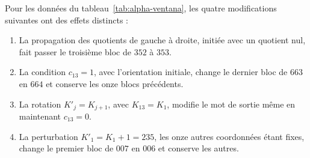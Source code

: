 \begin{proposition}
\label{mg05:dependencias}
Pour les données du tableau~\ref{tab:alpha-ventana}, les quatre modifications suivantes ont des effets distincts :
\begin{enumerate}
\item La propagation des quotients de gauche à droite, initiée avec un
quotient nul, fait passer le troisième bloc de \(352\) à \(353\).
\item La condition \(c_{13}=1\), avec l'orientation initiale, change le dernier bloc de \(663\) en \(664\) et conserve les onze blocs précédents.
\item La rotation \(K'_j=K_{j+1}\), avec \(K_{13}=K_1\), modifie
le mot de sortie même en maintenant \(c_{13}=0\).
\item La perturbation \(K'_1=K_1+1=235\), les onze autres coordonnées étant fixes, change le premier bloc de \(007\) en \(006\) et conserve les autres.
\end{enumerate}
\end{proposition}
